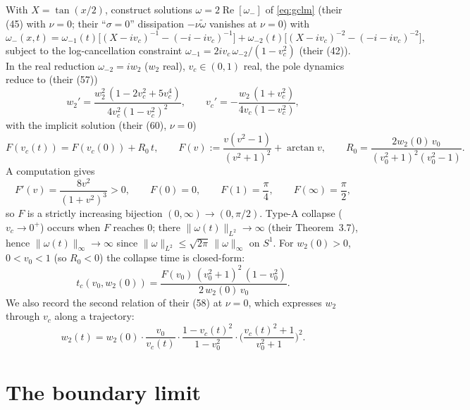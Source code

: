 \documentclass[11pt,a4paper]{article}
\theoremstyle{plain}
\theoremstyle{definition}
\theoremstyle{plain}
\newcommand{\Sone}{S^1}
\newcommand{\nrm}[1]{\lVert #1 \rVert}
\DeclareMathOperator{\Real}{Re}
\begin{document}
With $X=\tan(x/2)$, \cite[\S3.1]{SLSA25} construct solutions $\omega=2\Real[\omega_-]$ of \eqref{eq:gclm} (their (45) with $\nu=0$; their ``$\sigma=0$'' dissipation $-\nu\tilde\omega$ vanishes at $\nu=0$) with
\begin{equation}\label{eq:field}
\omega_-(x,t)=\omega_{-1}(t)\Big[(X-iv_c)^{-1}-(-i-iv_c)^{-1}\Big]+\omega_{-2}(t)\Big[(X-iv_c)^{-2}-(-i-iv_c)^{-2}\Big],
\end{equation}
subject to the log-cancellation constraint $\omega_{-1}=2iv_c\,\omega_{-2}/(1-v_c^2)$ (their (42)). In the real reduction $\omega_{-2}=iw_2$ ($w_2$ real), $v_c\in(0,1)$ real, the pole dynamics reduce to (their (57))
\begin{equation}\label{eq:ode}
w_2'=\frac{w_2^2\,(1-2v_c^2+5v_c^4)}{4v_c^2(1-v_c^2)^2},\qquad v_c'=-\frac{w_2\,(1+v_c^2)}{4v_c(1-v_c^2)},
\end{equation}
with the implicit solution (their (60), $\nu=0$)
\begin{equation}\label{eq:implicit}
F(v_c(t))=F(v_c(0))+R_0\,t,\qquad F(v):=\frac{v(v^2-1)}{(v^2+1)^2}+\arctan v,\qquad R_0=\frac{2w_2(0)\,v_0}{(v_0^2+1)^2(v_0^2-1)}.
\end{equation}
A computation gives
\begin{equation}\label{eq:Fprime}
F'(v)=\frac{8v^2}{(1+v^2)^3}>0,\qquad F(0)=0,\qquad F(1)=\frac{\pi}{4},\qquad F(\infty)=\frac{\pi}{2},
\end{equation}
so $F$ is a strictly increasing bijection $(0,\infty)\to(0,\pi/2)$. Type-A collapse ($v_c\to0^+$) occurs when $F$ reaches $0$; there $\nrm{\omega(t)}_{L^2}\to\infty$ (their Theorem~3.7), hence $\nrm{\omega(t)}_\infty\to\infty$ since $\nrm{\omega}_{L^2}\le\sqrt{2\pi}\,\nrm{\omega}_\infty$ on $\Sone$. For $w_2(0)>0$, $0<v_0<1$ (so $R_0<0$) the collapse time is closed-form:
\begin{equation}\label{eq:tc}
t_c(v_0,w_2(0))=\frac{F(v_0)\,(v_0^2+1)^2\,(1-v_0^2)}{2\,w_2(0)\,v_0}.
\end{equation}
We also record the second relation of their (58) at $\nu=0$, which expresses $w_2$ through $v_c$ along a trajectory:
\begin{equation}\label{eq:w2rel}
w_2(t)=w_2(0)\cdot\frac{v_0}{v_c(t)}\cdot\frac{1-v_c(t)^2}{1-v_0^2}\cdot\Big(\frac{v_c(t)^2+1}{v_0^2+1}\Big)^2.
\end{equation}

\section{The boundary limit}\label{sec:boundary}
\end{document}
